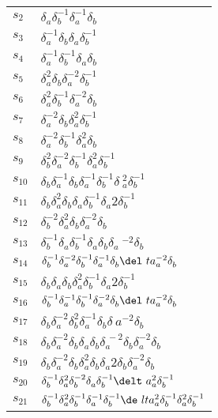 \documentclass{article}
\begin{document}
\begin{center}
\begin{tabular}{ll}
$s_{2}$ & $\delta_a^{}\delta_b^{-1}\delta_a^{-1}\delta_b^{}$ \\
$s_{3}$ & $\delta_a^{-1}\delta_b^{}\delta_a^{}\delta_b^{-1}$ \\
$s_{4}$ & $\delta_a^{-1}\delta_b^{-1}\delta_a^{}\delta_b^{}$ \\
$s_{5}$ & $\delta_a^{2}\delta_b^{}\delta_a^{-2}\delta_b^{-1}$ \\
$s_{6}$ & $\delta_a^{2}\delta_b^{-1}\delta_a^{-2}\delta_b^{}$ \\
$s_{7}$ & $\delta_a^{-2}\delta_b^{}\delta_a^{2}\delta_b^{-1}$ \\
$s_{8}$ & $\delta_a^{-2}\delta_b^{-1}\delta_a^{2}\delta_b^{}$ \\
$s_{9}$ & $\delta_b^{2}\delta_a^{-2}\delta_b^{-1}\delta_a^{2}\delta_b^{-1}$ \\
$s_{10}$ & $\delta_b^{}\delta_a^{-1}\delta_b^{}\delta_a^{-1}\delta_b^{-1}\delta\
_a^{2}\delta_b^{-1}$ \\
$s_{11}$ & $\delta_b^{}\delta_a^{2}\delta_b^{}\delta_a^{}\delta_b^{-1}\delta_a^\
{2}\delta_b^{-1}$ \\
$s_{12}$ & $\delta_b^{-2}\delta_a^{2}\delta_b^{}\delta_a^{-2}\delta_b^{}$ \\
$s_{13}$ & $\delta_b^{-1}\delta_a^{}\delta_b^{-1}\delta_a^{}\delta_b^{}\delta_a\
^{-2}\delta_b^{}$ \\
$s_{14}$ & $\delta_b^{-1}\delta_a^{-2}\delta_b^{-1}\delta_a^{-1}\delta_b^{}\del\
ta_a^{-2}\delta_b^{}$ \\
$s_{15}$ & $\delta_b^{}\delta_a^{}\delta_b^{}\delta_a^{2}\delta_b^{-1}\delta_a^\
{2}\delta_b^{-1}$ \\
$s_{16}$ & $\delta_b^{-1}\delta_a^{-1}\delta_b^{-1}\delta_a^{-2}\delta_b^{}\del\
ta_a^{-2}\delta_b^{}$ \\
$s_{17}$ & $\delta_b^{}\delta_a^{-2}\delta_b^{2}\delta_a^{-1}\delta_b^{}\delta_\
a^{-2}\delta_b^{}$ \\
$s_{18}$ & $\delta_b^{}\delta_a^{-2}\delta_b^{}\delta_a^{}\delta_b^{}\delta_a^{\
-2}\delta_b^{}\delta_a^{-2}\delta_b^{}$ \\
$s_{19}$ & $\delta_b^{}\delta_a^{-2}\delta_b^{}\delta_a^{2}\delta_b^{}\delta_a^\
{2}\delta_b^{}\delta_a^{-2}\delta_b^{}$ \\
$s_{20}$ & $\delta_b^{-1}\delta_a^{2}\delta_b^{-2}\delta_a^{}\delta_b^{-1}\delt\
a_a^{2}\delta_b^{-1}$ \\
$s_{21}$ & $\delta_b^{-1}\delta_a^{2}\delta_b^{-1}\delta_a^{-1}\delta_b^{-1}\de\
lta_a^{2}\delta_b^{-1}\delta_a^{2}\delta_b^{-1}$ \\
\bottomrule
\end{tabular}
\end{center}

\thispagestyle{empty}
\end{document}
